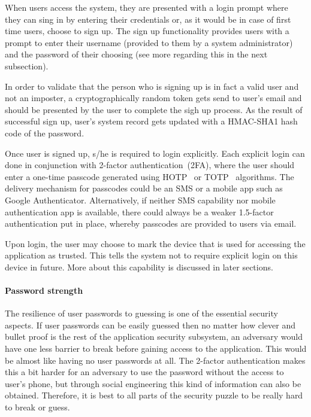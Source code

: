 \documentclass[a4paper,12pt,oneside,openright]{memoir}
\begin{document}
	When users access the system, they are presented with a login prompt where they can sing in by entering their credentials or, as it would be in case of first time users, choose to sign up.
	The sign up functionality provides users with a prompt to enter their username (provided to them by a system administrator) and the password of their choosing (see more regarding this in the next subsection).

	In order to validate that the person who is signing up is in fact a valid user and not an imposter, a cryptographically random token gets send to user's email and should be presented by the user to complete the sigh up process.
	As the result of successful sign up, user's system record gets updated with a HMAC-SHA1 hash code of the password.

	Once user is signed up, s/he is required to login explicitly.
	Each explicit login can done in conjunction with 2-factor authentication~(2FA), where the user should enter a one-time passcode generated using HOTP~\cite{HOTP} or TOTP~\cite{TOTP} algorithms.
	The delivery mechanism for passcodes could be an SMS or a mobile app such as Google Authenticator.
	Alternatively, if neither SMS capability nor mobile authentication app is available, there could always be a weaker 1.5-factor authentication put in place, whereby passcodes are provided to users via email.

	Upon login, the user may choose to mark the device that is used for accessing the application as trusted.
	This tells the system not to require explicit login on this device in future.
	More about this capability is discussed in later sections.

	\paragraph*{Password strength}
	The resilience of user passwords to guessing is one of the essential security aspects.
	If user passwords can be easily guessed then no matter how clever and bullet proof is the rest of the application security subsystem, an adversary would have one less barrier to break before gaining access to the application.
	This would be almost like having no user passwords at all.
	The 2-factor authentication makes this a bit harder for an adversary to use the password without the access to user's phone, but through social engineering this kind of information can also be obtained.
	Therefore, it is best to all parts of the security puzzle to be really hard to break or guess.
\end{document}
